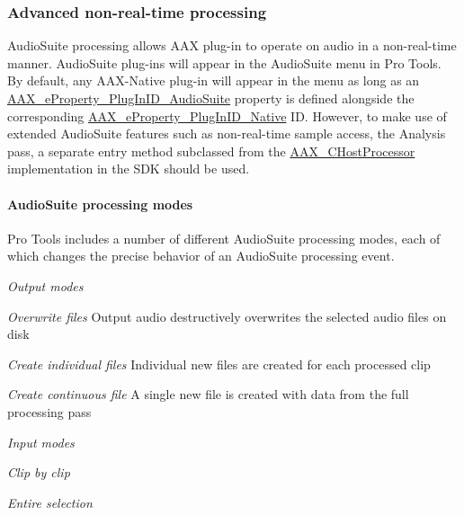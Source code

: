 \hypertarget{a00360_subsection__advanced_non-real-time_processing}{}\subsubsection{Advanced non-\/real-\/time processing}\label{a00360_subsection__advanced_non-real-time_processing}
 Audio\+Suite processing allows A\+A\+X plug-\/in to operate on audio in a non-\/real-\/time manner. Audio\+Suite plug-\/ins will appear in the Audio\+Suite menu in Pro Tools. By default, any A\+A\+X-\/\+Native plug-\/in will appear in the menu as long as an \hyperlink{a00283_a6571f4e41a5dd06e4067249228e2249ead3344696b8298a8b254add3d039ea927}{A\+A\+X\+\_\+e\+Property\+\_\+\+Plug\+In\+I\+D\+\_\+\+Audio\+Suite} property is defined alongside the corresponding \hyperlink{a00283_a6571f4e41a5dd06e4067249228e2249ea89ca3dd6e96895cda14976c1b1ceb826}{A\+A\+X\+\_\+e\+Property\+\_\+\+Plug\+In\+I\+D\+\_\+\+Native} I\+D. However, to make use of extended Audio\+Suite features such as non-\/real-\/time sample access, the Analysis pass, a separate entry method subclassed from the \hyperlink{a00020}{A\+A\+X\+\_\+\+C\+Host\+Processor} implementation in the S\+D\+K should be used.

\hypertarget{a00360_subsubsection__audiosuite_processing_modes_}{}\paragraph{Audio\+Suite processing modes}\label{a00360_subsubsection__audiosuite_processing_modes_}
 Pro Tools includes a number of different Audio\+Suite processing modes, each of which changes the precise behavior of an Audio\+Suite processing event.

{\itshape Output modes } 
\begin{DoxyItemize}
\item {\itshape  Overwrite files} Output audio destructively overwrites the selected audio files on disk  
\item {\itshape  Create individual files} Individual new files are created for each processed clip  
\item {\itshape  Create continuous file} A single new file is created with data from the full processing pass  
\end{DoxyItemize}

{\itshape Input modes } 
\begin{DoxyItemize}
\item {\itshape  Clip by clip}  
\item {\itshape  Entire selection}  
\end{DoxyItemize}

